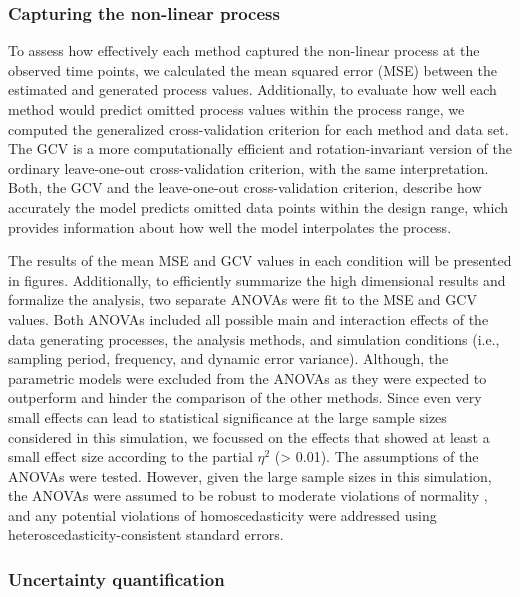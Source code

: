 \documentclass[man, floatsintext]{apa7}
\begin{document}
\subsubsection{Capturing the non-linear process}

To assess how effectively each method captured the non-linear process at the
observed time points, we calculated the mean squared error (MSE) between the
estimated and generated process values. Additionally, to evaluate how well each
method would predict omitted process values within the process range, we
computed the generalized cross-validation
\parencite[GCV;][]{golub_generalized_1979} criterion for each method and data
set. The GCV is a more computationally efficient and rotation-invariant version
of the ordinary leave-one-out cross-validation criterion, with the same
interpretation. Both, the GCV and the leave-one-out cross-validation criterion,
describe how accurately the model predicts omitted data points within the
design range, which provides information about how well the model interpolates
the process.

The results of the mean MSE and GCV values in each condition will be presented
in figures. Additionally, to efficiently summarize the high dimensional results
and formalize the analysis, two separate ANOVAs were fit to the MSE and GCV
values. Both ANOVAs included all possible main and interaction effects of the
data generating processes, the analysis methods, and simulation conditions
(i.e., sampling period, frequency, and dynamic error variance). Although, the
parametric models were excluded from the ANOVAs as they were expected to
outperform and hinder the comparison of the other methods. Since even very
small effects can lead to statistical significance at the large sample
sizes considered in this simulation, we focussed on the effects that showed at
least a small effect size according to the partial $\eta^2$ (> 0.01). The
assumptions of the ANOVAs were tested. However, given the large sample sizes in
this simulation, the ANOVAs were assumed to be robust to moderate violations of
normality \parencite{blanca_non-normal_2017}, and any potential violations of
homoscedasticity were addressed using heteroscedasticity-consistent standard
errors.

\subsubsection{Uncertainty quantification}
\end{document}
